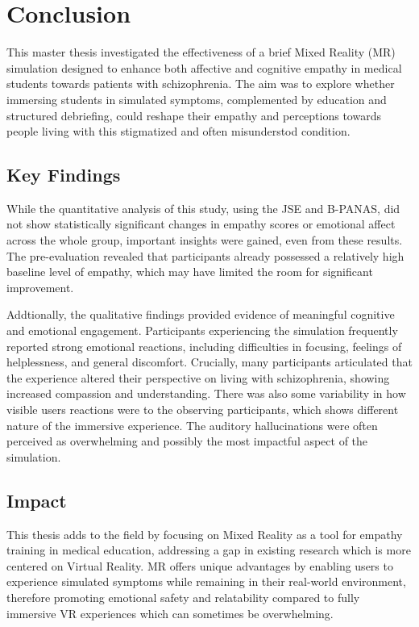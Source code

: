 \chapter{Conclusion}
\label{ch:conclusions}


This master thesis investigated the effectiveness of a brief Mixed Reality (MR) simulation designed to enhance both affective and cognitive empathy in medical students towards patients with schizophrenia. The aim was to explore whether immersing students in simulated symptoms, complemented by education and structured debriefing, could reshape their empathy and perceptions towards people living with this stigmatized and often misunderstod condition.

\section{Key Findings}
While the quantitative analysis of this study, using the JSE and B-PANAS, did not show statistically significant changes in empathy scores or emotional affect across the whole group, important insights were gained, even from these results. The pre-evaluation revealed that participants already possessed a relatively high baseline level of empathy, which may have limited the room for significant improvement.

\vspace{1em}

Addtionally, the qualitative findings provided evidence of meaningful cognitive and emotional engagement. Participants experiencing the simulation frequently reported strong emotional reactions, including difficulties in focusing, feelings of helplessness, and general discomfort. Crucially, many participants articulated that the experience altered their perspective on living with schizophrenia, showing increased compassion and understanding. There was also some variability in how visible users reactions were to the observing participants, which shows different nature of the immersive experience. The auditory hallucinations were often perceived as overwhelming and possibly the most impactful aspect of the simulation.


\section{Impact}
This thesis adds to the field by focusing on Mixed Reality as a tool for empathy training in medical education, addressing a gap in existing research which is more centered on Virtual Reality. MR offers unique advantages by enabling users to experience simulated symptoms while remaining in their real-world environment, therefore promoting emotional safety and relatability compared to fully immersive VR experiences which can sometimes be overwhelming.

